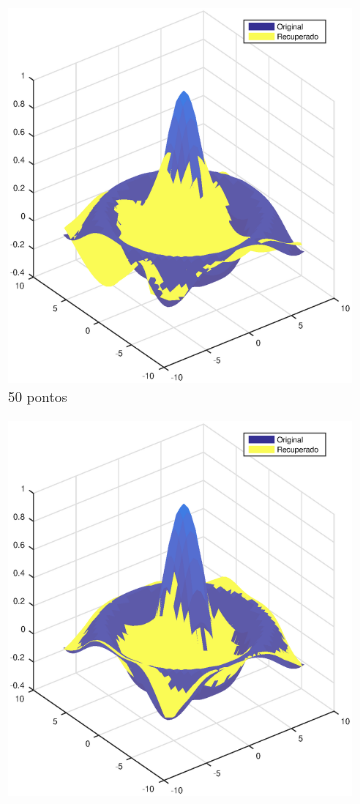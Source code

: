 \begin{figure}[H]
	\centering
	\begin{subfigure}[b]{0.48\textwidth}
		\centering
		\includegraphics[width=\textwidth]{imagens/cap4/rep3_50.eps}
		\caption{50 pontos}
		\label{fig:ex31}
	\end{subfigure}
	\hfill
	\begin{subfigure}[b]{0.48\textwidth}
		\centering
		\includegraphics[width=\textwidth]{imagens/cap4/rep3_200.eps}

\end{subfigure}
\end{figure}
